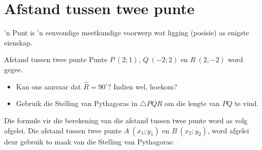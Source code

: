 \section{Afstand tussen twee punte}
'n Punt is 'n eenvoudige meetkundige voorwerp wat ligging (posisie) as enigste eienskap. 


\begin{Investigation}{Afstand tussen twee punte}
Punte $P~(2;1)$, $Q~(-2;2)$ en $R~(2,-2)$ word gegee. 
\begin{itemize}
 \item Kan ons aanvaar dat $\hat{R}=90^{\circ}$? Indien wel, hoekom?
\item Gebruik die Stelling van Pythagoras in $\triangle PQR$ om die lengte van $PQ$ te vind.
\end{itemize}

\setcounter{subfigure}{0}
\begin{figure}[H] %
\begin{center}
\end{center}
\label{fig:trianglePQR}
\end{figure} 
\end{Investigation}       
%       
Die formule vir die berekening van die afstand tussen twee punte word as volg afgelei. Die afstand tussen twee
punte $A~({x}_{1};{y}_{1})$ en $B~({x}_{2};{y}_{2})$, word afgelei deur gebruik to maak van die Stelling van Pythagoras:\par 

